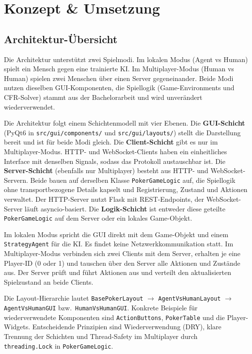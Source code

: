 
\section{Konzept \& Umsetzung}

\subsection{Architektur-Übersicht}

Die Architektur unterstützt zwei Spielmodi.
Im lokalen Modus (Agent vs Human) spielt ein Mensch gegen eine trainierte KI.
Im Multiplayer-Modus (Human vs Human) spielen zwei Menschen über einen Server gegeneinander.
Beide Modi nutzen dieselben GUI-Komponenten, die Spiellogik (Game-Environments und CFR-Solver) stammt aus der Bachelorarbeit und wird unverändert wiederverwendet.

Die Architektur folgt einem Schichtenmodell mit vier Ebenen.
Die \textbf{GUI-Schicht} (PyQt6 in \texttt{src/gui/components/} und \texttt{src/gui/layouts/}) stellt die Darstellung bereit und ist für beide Modi gleich.
Die \textbf{Client-Schicht} gibt es nur im Multiplayer-Modus.
HTTP- und WebSocket-Clients haben ein einheitliches Interface mit denselben Signals, sodass das Protokoll austauschbar ist.
Die \textbf{Server-Schicht} (ebenfalls nur Multiplayer) besteht aus HTTP- und WebSocket-Servern.
Beide bauen auf derselben Klasse \texttt{PokerGameLogic} auf, die Spiellogik ohne transportbezogene Details kapselt und Registrierung, Zustand und Aktionen verwaltet.
Der HTTP-Server nutzt Flask mit REST-Endpoints, der WebSocket-Server läuft asyncio-basiert.
Die \textbf{Logik-Schicht} ist entweder diese geteilte \texttt{PokerGameLogic} auf dem Server oder ein lokales Game-Objekt.

Im lokalen Modus spricht die GUI direkt mit dem Game-Objekt und einem \texttt{StrategyAgent} für die KI.
Es findet keine Netzwerkkommunikation statt.
Im Multiplayer-Modus verbinden sich zwei Clients mit dem Server, erhalten je eine Player-ID (0 oder 1) und tauschen über den Server alle Aktionen und Zustände aus.
Der Server prüft und führt Aktionen aus und verteilt den aktualisierten Spielzustand an beide Clients.

Die Layout-Hierarchie lautet \texttt{BasePokerLayout} $\rightarrow$ \texttt{AgentVsHumanLayout} $\rightarrow$ \texttt{AgentVsHumanGUI} bzw.\ \texttt{HumanVsHumanGUI}.
Konkrete Beispiele für wiederverwendete Komponenten sind \texttt{ActionButtons}, \texttt{PokerTable} und die Player-Widgets.
Entscheidende Prinzipien sind Wiederverwendung (DRY), klare Trennung der Schichten und Thread-Safety im Multiplayer durch \texttt{threading.Lock} in \texttt{PokerGameLogic}.

